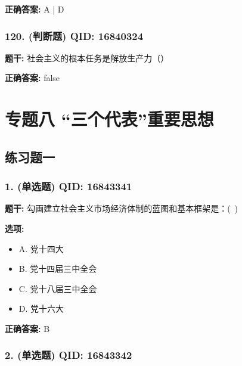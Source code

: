 \documentclass[12pt,UTF8]{ctexart}
\begin{document}
\textbf{正确答案:}
A | D

\vspace{0.3em}\hrulefill\vspace{0.7em}

\subsubsection*{120. (判断题) \small QID: 16840324}

\textbf{题干:}
社会主义的根本任务是解放生产力（）

\textbf{正确答案:}
false

\vspace{0.3em}\hrulefill\vspace{0.7em}

\section*{专题八 “三个代表”重要思想}
\hrulefill

\subsection*{练习题一}

\subsubsection*{1. (单选题) \small QID: 16843341}

\textbf{题干:}
勾画建立社会主义市场经济体制的蓝图和基本框架是：( )

\textbf{选项:}
\begin{itemize}[leftmargin=*]

  \item A. 党十四大

  \item B. 党十四届三中全会

  \item C. 党十八届三中全会

  \item D. 党十六大

\end{itemize}

\textbf{正确答案:}
B

\vspace{0.3em}\hrulefill\vspace{0.7em}

\subsubsection*{2. (单选题) \small QID: 16843342}
\end{document}
